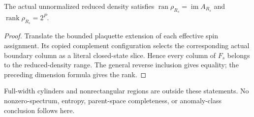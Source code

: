 \begin{lemma}%
    \label{thm:czx_wrapping_density}
    \leanok
    The actual unnormalized reduced density satisfies
    $\operatorname{ran}\rho_{R_s}=\operatorname{im}A_{R_s}$ and
    $\operatorname{rank}\rho_{R_s}=2^P$.
\end{lemma}
\begin{proof}\leanok
    Translate the bounded plaquette extension of each effective spin
    assignment. Its copied complement configuration selects the corresponding
    actual boundary column as a literal closed-state slice. Hence every
    column of $F_s$ belongs to the reduced-density range. The general
    reverse inclusion gives equality; the preceding dimension formula gives
    the rank.
\end{proof}

Full-width cylinders and nonrectangular regions are outside these statements.
No nonzero-spectrum, entropy, parent-space completeness, or anomaly-class
conclusion follows here.
